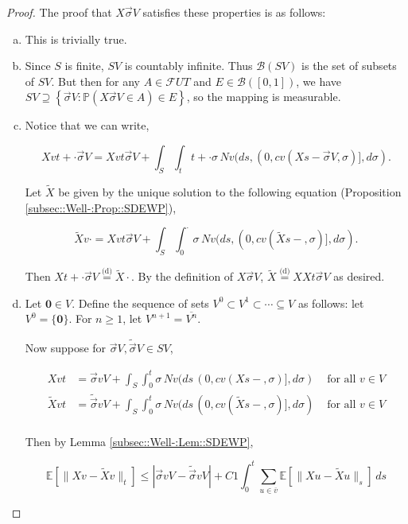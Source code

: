 \documentclass[12pt]{article}
\newcommand{\mb}{\mathbb}
\newcommand{\mc}{\mathcal}
\newcommand{\ms}{\mathscr}
\newcommand{\ov}{\overline}
\newcommand{\te}{\text}
\newcommand{\ind}{\hspace{24pt}}
\newcommand{\pr}{\mb{P}}							%
\newcommand{\ex}[1]{\mb{E}\left[#1\right]}			%
\newcommand{\deq}{\overset{\text{(d)}}{=}}			%
\renewcommand{\root}{\mathbf{0}}				%
\renewcommand{\v}{v}							%
\newcommand{\vv}{u}								%
\renewcommand{\U}{U}							%
\renewcommand{\S}{S}							%
\newcommand{\s}{\sigma}							%
\newcommand{\sv}{\vec{\s}}						%
\newcommand{\T}{T}								%
\renewcommand{\t}{t}							%
\renewcommand{\tt}{s}							%
\newcommand{\F}{\mc{F}}							%
\newcommand{\X}{X}								%
\newcommand{\IGr}{c}							%
\newcommand{\cl}{\ov}							%
\newcommand{\const}{C}							%
\newcommand{\sln}[1]{^{#1}}						%
\newcommand{\poiss}{N}							%
\newcommand{\alt}[1]{\widetilde{#1}}			%
\begin{document}
\begin{proof}
The proof that \(\X{}{}{\sv{}{V}}\) satisfies these properties is as follows:

\begin{enumerate}[(a)]
\item This is trivially true.

\item Since \(\S\) is finite, \(\S{V}\) is countably infinite. Thus \(\ms{B}(\S{V})\) is the set of subsets of \(\S{V}\). But then for any \(A \in \F{\U}{\T}\) and \(E \in \ms{B}([0,1])\), we have \(\S{V} \supseteq \left\{\sv{}{V}: \pr\left(\X{}{}{\sv{}{V}} \in A\right) \in E\right\}\), so the mapping is measurable.

\item Notice that we can write,

\[\X{\v}{\t+\cdot}{\sv{}{V}} = \X{\v}{\t}{\sv{}{V}} + \int_\S\int_\t{\t+\cdot} \s\,\poiss{\v}(d\tt,(0,\IGr{\v}(\X{}{\tt-}{\sv{}{V}},\s)],d\s).\]

Let \(\alt{\X}{}{}\) be given by the unique solution to the following equation (Proposition \ref{subsec::Well-:Prop::SDEWP}),

\[\alt{\X}{\v}{\cdot} = \X{\v}{\t}{\sv{}{V}} + \int_\S \int_0^\cdot \s\,\poiss{\v}(d\tt,(0,\IGr{\v}(\alt{\X}{}{\tt-},\s)],d\s).\]

Then \(\X{}{\t+\cdot}{\sv{}{V}} \deq \alt{\X}{}{\cdot}\). By the definition of \(\X{}{}{\sv{}{V}}\), \(\alt{\X}{}{} \deq \X{}{}{\X{}{\t}{\sv{}{V}}}\) as desired.

\item Let \(\root \in V\). Define the sequence of sets \(V\sln{0}\subset V\sln{1}\subset \cdots \subseteq V\) as follows: let \(V\sln{0} = \{\root\}\). For \(n \geq 1\), let \(V\sln{n+1} = \cl{V\sln{n}}\).

\ind Now suppose for \(\sv{}{V},\alt{\sv}{}{V}\in \S{V}\),

\begin{align*}
\X{\v}{\t} &= \sv{\v}{V} + \int_\S\int_0^\t \s\,\poiss{\v}(d\tt\,(0,\IGr{\v}(\X{}{\tt-},\s)],d\s)&\te{ for all } \v \in V\\
\alt{\X}{\v}{\t} &= \alt{\sv}{\v}{V} + \int_\S\int_0^\t \s\,\poiss{\v}(d\tt\,(0,\IGr{\v}(\alt{\X}{}{\tt-},\s)],d\s)&\te{ for all } \v \in V\\
\end{align*}

Then by Lemma \ref{subsec::Well-:Lem::SDEWP},

\[\ex{\|\X{\v}{} - \alt{\X}{\v}{}\|_\t} \leq |\sv{\v}{V} - \alt{\sv}{\v}{V}| + \const{1}\int_0^\t \sum_{\vv\in \cl{\v}} \ex{\|\X{\vv}{} - \alt{\X}{\vv}{}\|_\tt}\,d\tt\]


\end{enumerate}
\end{proof}
\end{document}
